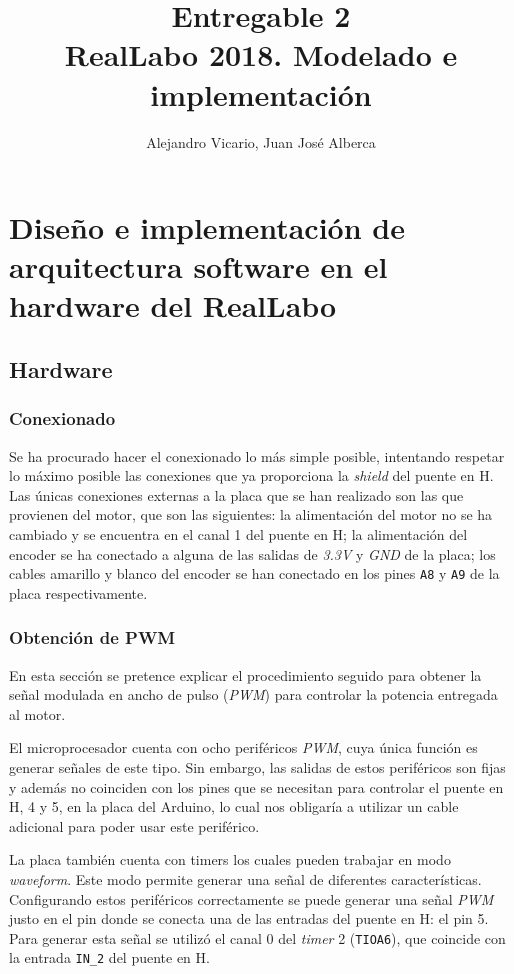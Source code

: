 \documentclass{article}
\begin{document}
\title{Entregable 2 \\
\large RealLabo 2018. Modelado e implementación}
\author{Alejandro Vicario, Juan José Alberca}

\maketitle


\section{Diseño e implementación de arquitectura software en el hardware del RealLabo}
\subsection{Hardware}

\subsubsection{Conexionado}
Se ha procurado hacer el conexionado lo más simple posible, intentando respetar lo máximo posible las conexiones que ya proporciona la \emph{shield} del puente en H.
Las únicas conexiones externas a la placa que se han realizado son las que provienen del motor, que son las siguientes:
la alimentación del motor no se ha cambiado y se encuentra en el canal 1 del puente en H;
la alimentación del encoder se ha conectado a alguna de las salidas de \emph{3.3V} y \emph{GND} de la placa;
los cables amarillo y blanco del encoder se han conectado en los pines \texttt{A8} y \texttt{A9} de la placa respectivamente.

\subsubsection{Obtención de PWM}
En esta sección se pretence explicar el procedimiento seguido para obtener la señal modulada en ancho de pulso (\emph{PWM}) para controlar la potencia entregada al motor.

El microprocesador cuenta con ocho periféricos \emph{PWM}, cuya única función es generar señales de este tipo. Sin embargo,
las salidas de estos periféricos son fijas y además no coinciden con los pines que se necesitan para controlar el puente en H, 4 y 5, en la placa del Arduino,
lo cual nos obligaría a utilizar un cable adicional para poder usar este periférico.

La placa también cuenta con timers los cuales pueden trabajar en modo \emph{waveform}.
Este modo permite generar una señal de diferentes características.
Configurando estos periféricos correctamente se puede generar una señal \emph{PWM} justo en el pin donde se conecta una de las entradas del puente en H: el pin 5.
Para generar esta señal se utilizó el canal 0 del \emph{timer} 2 (\texttt{TIOA6}), que coincide con la entrada \texttt{IN\_2} del puente en H.
\end{document}
